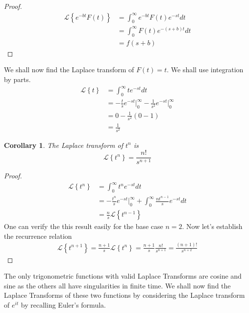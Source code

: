 \documentclass{report}
\newtheorem{corollary}[theorem]{Corollary}
\theoremstyle{definition}
\theoremstyle{remark}
\newcommand{\lapt}[1]{\mathscr{L}\left\{ #1\right\}}
\begin{document}
\begin{proof}
    \begin{equation*}
        \begin{split}
            \lapt{e^{-bt}F(t)}&= \int^\infty_0 e^{-bt}F(t) e^{-st}dt \\ 
            &= \int^\infty_0 F(t)e^{-(s+b)t}dt\\
            &=f(s+b)
        \end{split}
    \end{equation*}
\end{proof}
We shall now find the Laplace transform of $F(t) = t$. We shall use integration by parts. 
\begin{equation*}
\begin{split}
    \lapt{t} &= \int^\infty_0 te^{-st} dt \\
    &= - \frac{t}{s}e^{-st} \Bigg|^\infty_0 - \frac{1}{s^2} e^{-st}\Bigg|^\infty_0 \\
   & =0- \frac{1}{s^2}(0-1) \\
   &= \frac{1}{s^2}
\end{split}
\end{equation*}
\begin{corollary}
The Laplace transform of $t^n$ is 
    \begin{equation}
        \lapt{t^n} = \frac{n!}{s^{n+1}}
    \end{equation} \label{cor:tn}
\end{corollary}
\begin{proof}
    \begin{equation*}
    \begin{split}
        \lapt{t^n} &= \int^\infty_0t^ne^{-st}dt\\
        &= - \frac{t^n}{s}e^{-st}\Bigg|^\infty_0 + \int^\infty_0 \frac{nt^{n-1}}{s}e^{-st} dt \\
        &= \frac{n}{s} \lapt{t^{n-1}}
    \end{split}
    \end{equation*}
    One can verify the this result easily for the base case $n=2$. Now let's establish the recurrence relation
    \begin{equation*}
        \begin{split}
            \lapt{t^{n+1}} = \frac{n+1}{s}\lapt{t^n} = \frac{n+1}{s}\frac{n!}{s^{n+1}} = \frac{(n+1)!}{s^{n+2}}
        \end{split}
    \end{equation*}
\end{proof}
The only trigonometric functions with valid Laplace Transforms are cosine and sine as the others all have singularities in finite time. We shall now find the Laplace Transforms of these two functions by considering the Laplace transform of $e^{it}$ by recalling Euler's formula.
\end{document}
